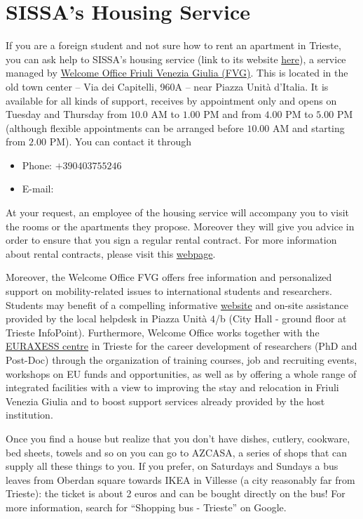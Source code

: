 \documentclass{sissavademecum}
\begin{document}
\section{SISSA's Housing Service}

If you are a foreign student and not sure how to rent an apartment in Trieste, you can ask help to SISSA's housing service (link to its website \href{https://www.sissa.it/housing}{here}), a service managed by \href{http://www.welcomeoffice.fvg.it}{Welcome Office Friuli Venezia Giulia (FVG)}. This is located in the old town center -- Via dei Capitelli, 960A -- near Piazza Unità d'Italia. It is available for all kinds of support, receives by appointment only and opens on Tuesday and Thursday from $10.0$ AM to $1.00$ PM and from $4.00$ PM to $5.00$ PM (although flexible appointments can be arranged before $10.00$ AM and starting from $2.00$ PM). You can contact it through 
\begin{itemize}
	\item Phone: $+39 040 375 5246$
	\item E-mail: 
\end{itemize}

At your request, an employee of the housing service will accompany you to visit the rooms or the apartments they propose. Moreover they will give you advice in order to ensure that you sign a regular rental contract. For more information about rental contracts, please visit this \href{https://wiki.sissa.it/students/index.php/House_rental_contract}{webpage}.

Moreover, the Welcome Office FVG offers free information and personalized support on mobility-related issues to international students and researchers. Students may benefit of a compelling informative \href{link http://www.welcomeoffice.fvg.it/news/}{website} and on-site assistance provided by the local helpdesk in Piazza Unit\`a $4$/b (City Hall - ground floor at Trieste InfoPoint). Furthermore, Welcome Office works together with the \href{https://euraxess.ec.europa.eu/}{EURAXESS centre} in Trieste for the career development of researchers (PhD and Post-Doc) through the organization of training courses, job and recruiting events, workshops on EU funds and opportunities, as well as by offering a whole range of integrated facilities with a view to improving the stay and relocation in Friuli Venezia Giulia and to boost support services already provided by the host institution. 

Once you find a house but realize that you don't have dishes, cutlery, cookware, bed sheets, towels and so on you can go to AZCASA, a series of shops that can supply all these things to you. If you prefer, on Saturdays and Sundays a bus leaves from Oberdan square towards IKEA in Villesse (a city reasonably far from Trieste): the ticket is about 2 euros and can be bought directly on the bus! For more information, search for ``Shopping bus - Trieste'' on Google.
\end{document}
